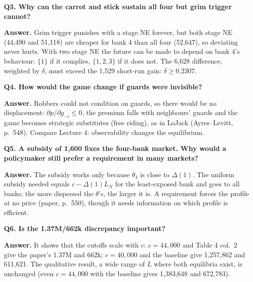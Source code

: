 \documentclass[11pt,a4paper]{article}
\newcommand{\answer}[1]{\begin{tcolorbox}[colback=ans!5,colframe=ans,boxrule=0.6pt,
  left=5pt,right=5pt,top=3pt,bottom=3pt]\textbf{Answer.} #1\end{tcolorbox}}
\newcommand{\Dl}{\Delta}
\begin{document}
\textbf{Q3. Why can the carrot and stick sustain all four but grim trigger cannot?}
\answer{Grim trigger punishes with a stage NE forever, but both stage NE (44,490 and 51,118) are cheaper for bank 4 than all four (52,647), so deviating never hurts. With two stage NE the future can be made to depend on
bank 4's behaviour: $\{1\}$ if it complies, $\{1,2,3\}$ if it does not. The 6,628 difference, weighted by $\delta$, must exceed the 1,529 short-run gain: $\delta\ge0.2307$.}

\textbf{Q4. How would the game change if guards were invisible?}
\answer{Robbers could not condition on guards, so there would be no displacement: $\partial p/\partial g_{-i}\le0$, the premium falls with neighbours' guards and the game becomes strategic substitutes (free riding),
as in LoJack (Ayres--Levitt, p.\ 548). Compare Lecture 4: observability changes the equilibrium.}

\textbf{Q5. A subsidy of 1,600 fixes the four-bank market. Why would a policymaker still prefer a requirement in many markets?}
\answer{The subsidy works only because $\theta_4$ is close to $\Dl(1)$. The uniform subsidy needed equals $c-\Dl(1)L_N$ for the least-exposed bank and goes to all banks; the more dispersed the $\theta$'s, the larger it is.
A requirement forces the profile at no price (paper, p.\ 550), though it needs information on which profile is efficient.}

\textbf{Q6. Is the 1.37M/662k discrepancy important?}
\answer{It shows that the cutoffs scale with $c$: $c=44{,}000$ and Table 4 col.\ 2 give the paper's 1.37M and 662k; $c=40{,}000$ and the baseline give 1,257,862 and 611,621. The qualitative result,
a wide range of $L$ where both equilibria exist, is unchanged (even $c=44{,}000$ with the baseline gives 1,383,648 and 672,783).}
\end{document}
